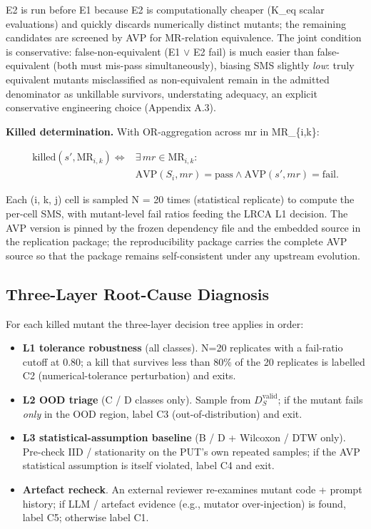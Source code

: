 \documentclass[manuscript,screen,review]{acmart}
\begin{document}
E2 is run before E1 because E2 is computationally cheaper (K\_eq scalar
evaluations) and quickly discards numerically distinct mutants; the
remaining candidates are screened by AVP for MR-relation equivalence.
The joint condition is conservative: false-non-equivalent (E1 $\vee$ E2 fail)
is much easier than false-equivalent (both must mis-pass
simultaneously), biasing SMS slightly \emph{low}: truly equivalent mutants misclassified
as non-equivalent remain in the admitted denominator as unkillable
survivors, understating adequacy, an explicit
conservative engineering choice (Appendix A.3).

\textbf{Killed determination.} With OR-aggregation across mr in
MR\_\{i,k\}:

\[
\begin{aligned}
\mathrm{killed}(s', \mathrm{MR}_{i,k}) \iff{} & \exists\,mr \in \mathrm{MR}_{i,k}: \\
& \mathrm{AVP}(S_i, mr) = \text{pass} \wedge
  \mathrm{AVP}(s', mr) = \text{fail}.
\end{aligned}
\]

Each (i, k, j) cell is sampled N = 20 times (statistical replicate) to
compute the per-cell SMS, with mutant-level fail ratios feeding the LRCA
L1 decision. The AVP version is pinned by the frozen dependency file and the
embedded source in the replication package; the reproducibility
package carries the complete AVP source so that the package remains
self-consistent under any upstream evolution.

\subsection{Three-Layer Root-Cause Diagnosis}\label{lrca-three-layer-diagnosis}

For each killed mutant the three-layer decision tree applies in order:

\begin{itemize}

\item
  \textbf{L1 tolerance robustness} (all classes). N=20 replicates with a
  fail-ratio cutoff at 0.80; a kill that survives less than 80\% of the
  20 replicates is labelled C2 (numerical-tolerance perturbation) and
  exits.
\item
  \textbf{L2 OOD triage} (C / D classes only). Sample from
  $D_S^{\mathrm{valid}}$; if the mutant fails \emph{only} in the OOD
  region, label C3 (out-of-distribution) and exit.
\item
  \textbf{L3 statistical-assumption baseline} (B / D + Wilcoxon / DTW
  only). Pre-check IID / stationarity on the PUT's own repeated samples;
  if the AVP statistical assumption is itself violated, label C4 and
  exit.
\item
  \textbf{Artefact recheck}. An external reviewer re-examines mutant
  code + prompt history; if LLM / artefact evidence (e.g., mutator
  over-injection) is found, label C5; otherwise label C1.
\end{itemize}
\end{document}
